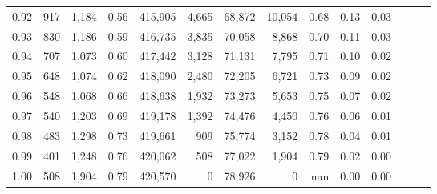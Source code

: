 \begin{tabular}{rrrrrrrrrrrrrr}
0.92 &    917 &  1,184 &  0.56 &  415,905 &    4,665 &  68,872 &  10,054 &  0.68 &  0.13 &      0.03 \\
0.93 &    830 &  1,186 &  0.59 &  416,735 &    3,835 &  70,058 &   8,868 &  0.70 &  0.11 &      0.03 \\
0.94 &    707 &  1,073 &  0.60 &  417,442 &    3,128 &  71,131 &   7,795 &  0.71 &  0.10 &      0.02 \\
0.95 &    648 &  1,074 &  0.62 &  418,090 &    2,480 &  72,205 &   6,721 &  0.73 &  0.09 &      0.02 \\
0.96 &    548 &  1,068 &  0.66 &  418,638 &    1,932 &  73,273 &   5,653 &  0.75 &  0.07 &      0.02 \\
0.97 &    540 &  1,203 &  0.69 &  419,178 &    1,392 &  74,476 &   4,450 &  0.76 &  0.06 &      0.01 \\
0.98 &    483 &  1,298 &  0.73 &  419,661 &      909 &  75,774 &   3,152 &  0.78 &  0.04 &      0.01 \\
0.99 &    401 &  1,248 &  0.76 &  420,062 &      508 &  77,022 &   1,904 &  0.79 &  0.02 &      0.00 \\
1.00 &    508 &  1,904 &  0.79 &  420,570 &        0 &  78,926 &       0 &   nan &  0.00 &      0.00 \\
\bottomrule
\end{tabular}
